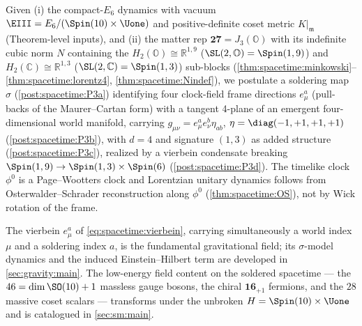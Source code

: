 \begin{postulate}\label{post:spacetime:P3master}
Given (i) the compact-$E_6$ dynamics with vacuum $\EIII=E_6/(\Spin(10)\times\Uone)$ and
positive-definite coset metric $K|_{\mathfrak m}$ (Theorem-level inputs), and (ii) the
matter rep $\mathbf{27}=J_3(\mathbb O)$ with its indefinite cubic norm $N$ containing the
$H_2(\mathbb O)\cong\mathbb R^{1,9}$ ($\SL(2,\mathbb O)=\Spin(1,9)$) and
$H_2(\mathbb C)\cong\mathbb R^{1,3}$ ($\SL(2,\mathbb C)=\Spin(1,3)$) sub-blocks
(\autoref{thm:spacetime:minkowski}--\autoref{thm:spacetime:lorentz4},
\autoref{thm:spacetime:Nindef}), we postulate a soldering map $\sigma$
(\autoref{post:spacetime:P3a}) identifying four clock-field frame directions $e^a_\mu$
(pull-backs of the Maurer--Cartan form) with a tangent 4-plane of an emergent
four-dimensional world manifold, carrying $g_{\mu\nu}=e^a_\mu e^b_\nu\eta_{ab}$,
$\eta=\diag(-1,+1,+1,+1)$ (\autoref{post:spacetime:P3b}), with $d=4$ and signature
$(1,3)$ as added structure (\autoref{post:spacetime:P3c}), realized by a vierbein
condensate breaking $\Spin(1,9)\to\Spin(1,3)\times\Spin(6)$
(\autoref{post:spacetime:P3d}). The timelike clock $\phi^0$ is a Page--Wootters clock
and Lorentzian unitary dynamics follows from Osterwalder--Schrader reconstruction along
$\phi^0$ (\autoref{thm:spacetime:OS}), not by Wick rotation of the frame.
\end{postulate}

The vierbein $e^a_\mu$ of \eqref{eq:spacetime:vierbein}, carrying simultaneously a
world index $\mu$ and a soldering index $a$, is the fundamental gravitational field; its
$\sigma$-model dynamics and the induced Einstein--Hilbert term are developed in
\autoref{sec:gravity:main}. The low-energy field content on the soldered spacetime ---
the $46=\dim\SO(10)+1$ massless gauge bosons, the chiral $\mathbf{16}_{+1}$ fermions,
and the $28$ massive coset scalars --- transforms under the unbroken
$H=\Spin(10)\times\Uone$ and is catalogued in \autoref{sec:sm:main}.

